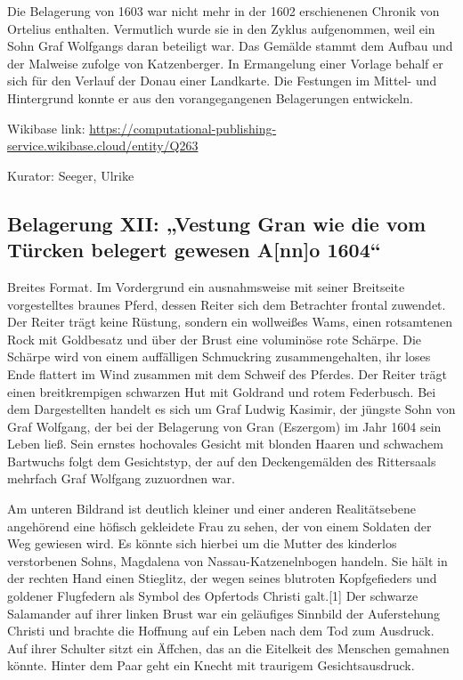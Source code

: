 \documentclass[
  letterpaper,
]{book}
\begin{document}
Die Belagerung von 1603 war nicht mehr in der 1602 erschienenen Chronik
von Ortelius enthalten. Vermutlich wurde sie in den Zyklus aufgenommen,
weil ein Sohn Graf Wolfgangs daran beteiligt war. Das Gemälde stammt dem
Aufbau und der Malweise zufolge von Katzenberger. In Ermangelung einer
Vorlage behalf er sich für den Verlauf der Donau einer Landkarte. Die
Festungen im Mittel- und Hintergrund konnte er aus den vorangegangenen
Belagerungen entwickeln.

Wikibase link:
\url{https://computational-publishing-service.wikibase.cloud/entity/Q263}

Kurator: Seeger, Ulrike

\subsection{Belagerung XII: „Vestung Gran wie die vom Türcken belegert
gewesen A{[}nn{]}o
1604``}\label{belagerung-xii-vestung-gran-wie-die-vom-tuxfcrcken-belegert-gewesen-anno-1604}

Breites Format. Im Vordergrund ein ausnahmsweise mit seiner Breitseite
vorgestelltes braunes Pferd, dessen Reiter sich dem Betrachter frontal
zuwendet. Der Reiter trägt keine Rüstung, sondern ein wollweißes Wams,
einen rotsamtenen Rock mit Goldbesatz und über der Brust eine voluminöse
rote Schärpe. Die Schärpe wird von einem auffälligen Schmuckring
zusammengehalten, ihr loses Ende flattert im Wind zusammen mit dem
Schweif des Pferdes. Der Reiter trägt einen breitkrempigen schwarzen Hut
mit Goldrand und rotem Federbusch. Bei dem Dargestellten handelt es sich
um Graf Ludwig Kasimir, der jüngste Sohn von Graf Wolfgang, der bei der
Belagerung von Gran (Eszergom) im Jahr 1604 sein Leben ließ. Sein
ernstes hochovales Gesicht mit blonden Haaren und schwachem Bartwuchs
folgt dem Gesichtstyp, der auf den Deckengemälden des Rittersaals
mehrfach Graf Wolfgang zuzuordnen war.

Am unteren Bildrand ist deutlich kleiner und einer anderen
Realitätsebene angehörend eine höfisch gekleidete Frau zu sehen, der von
einem Soldaten der Weg gewiesen wird. Es könnte sich hierbei um die
Mutter des kinderlos verstorbenen Sohns, Magdalena von
Nassau-Katzenelnbogen handeln. Sie hält in der rechten Hand einen
Stieglitz, der wegen seines blutroten Kopfgefieders und goldener
Flugfedern als Symbol des Opfertods Christi galt.{[}1{]} Der schwarze
Salamander auf ihrer linken Brust war ein geläufiges Sinnbild der
Auferstehung Christi und brachte die Hoffnung auf ein Leben nach dem Tod
zum Ausdruck. Auf ihrer Schulter sitzt ein Äffchen, das an die Eitelkeit
des Menschen gemahnen könnte. Hinter dem Paar geht ein Knecht mit
traurigem Gesichtsausdruck.
\end{document}
